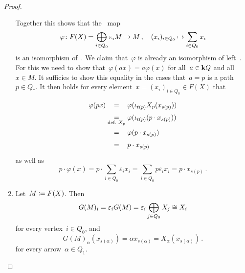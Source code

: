 \begin{proof}
\begin{enumerate}
      Together this shows that the~{\klin} map
      \[
                \varphi
        \colon  F(X)
        =       \bigoplus_{i \in Q_0} \varepsilon_i M
        \to     M \,,
        \quad   (x_i)_{i \in Q_0}
        \mapsto \sum_{i \in Q_0} x_i
      \]
      is an isomorphism of~{\modules{$\kf$}}.
      We claim that~$\varphi$ is already an isomorphism of left~{}.
      For this we need to show that~$\varphi(ax) = a \varphi(x)$ for all~$a \in \mathbf{k} Q$ and all~$x \in M$.
      It sufficies to show this equality in the cases that~$a = p$ is a path~$p \in Q_*$.
      It then holds for every element~$x = (x_i)_{i \in Q_0} \in F(X)$ that
      \[
        \begingroup
        \arraycolsep=1.4pt
        \renewcommand\arraystretch{1.5}
        \begin{array}{rcl}
          \varphi(px)
        & =
        & \varphi( \iota_{t(p)} X_p( x_{s(p)} ) )
        \\
          {}
        & \underset{ \text{def.~$X_p$} }{=}
        & \varphi( \iota_{t(p)}( p \cdot x_{s(p)} ) )
        \\
          {}
        & =
        & \varphi( p \cdot x_{s(p)} )
        \\
          {}
        & =
        & p \cdot x_{s(p)}
        \end{array}
        \endgroup
      \]
      as well as
      \[
          p \cdot \varphi(x)
        = p \cdot \sum_{i \in Q_0} \varepsilon_i x_i
        = \sum_{i \in Q_0} p \varepsilon_i x_i
        = p \cdot x_{s(p)} \,.
      \]
    \item
      Let~$M \coloneqq F(X)$.
      Then
      \[
              G(M)_i
        =     \varepsilon_i G(M)
        =     \varepsilon_i \bigoplus_{j \in Q_0} X_j
        \cong X_i
      \]
      for every vertex~$i \in Q_0$, and
      \[
          G(M)_\alpha( x_{s(\alpha)} )
        = \alpha x_{s(\alpha)}
        = X_\alpha( x_{s(\alpha)} ) \,.
      \]
      for every arrow~$\alpha \in Q_1$.
    \qedhere
  \end{enumerate}
\end{proof}


